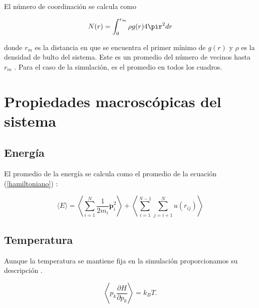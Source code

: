 

El número de coordinación se calcula como

\begin{equation}
    N(r) =  \int_0^{r_m} \rho g(r)4\pir^{2}dr
\end{equation}

\noindent donde $r_m$ es la distancia en que se encuentra el primer mínimo de $g(r)$ y $\rho$ es la densidad de bulto del sistema. Este es un promedio del número de vecinos hasta $r_m$ \cite{GOCHENOUR201841}. Para el caso de la simulación, es el promedio en todos los cuadros.\\

\section{Propiedades macroscópicas del sistema}

\subsection{Energía}

El promedio de la energía se calcula como el promedio de la ecuación (\ref{hamiltoniano}) \cite{Allen2017}:

\begin{equation} \label{promenergia}
    \langle E \rangle = \left \langle\sum_{i=1}^{N} \frac{1}{2 m_i}\dot{\mathbf{p}}_i^2 \right \rangle+ \left \langle\sum_{i=1}^{N-1}\sum_{j=i+1}^{N} u(r_{ij})\right \rangle
\end{equation}

\subsection{Temperatura}

Aunque la temperatura se mantiene fija en la simulación proporcionamos su descripción \cite{Allen2017}.

\begin{equation} \label{virialtheorem}
    \left \langle p_k \frac{\partial H}{\partial p_k} \right \rangle = k_B T.
\end{equation}


